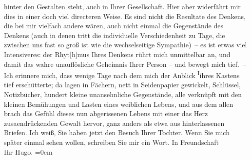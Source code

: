 \begin{ledgroupsized}[t]{13cm}
               hinter den Gestalten steht, auch in Ihrer Gesellschaft. Hier aber widerfährt mir dies
               in einer doch viel directeren Weise. Es sind nicht die Resultate des Denkens, die bei
               mir vielfach andere wären, auch nicht einmal die Gegenstände des Denkens (auch in
               denen tritt die individuelle Verschiedenheit zu Tage, die zwischen uns fast so groß
               ist wie die wechselseitige Sympathie) – {\pb}es ist etwas viel Intensiveres:
               der Rhyt{[}h{]}mus Ihres Denkens rührt mich unmittelbar an, und damit
               das wahre unauflösliche Geheimnis Ihrer Person – und bewegt mich tief. – Ich erinnere
               mich, dass wenige Tage nach dem \label{K_L02496-1v}\label{K_L02496-1h} mich der Anblick \substVorne{}\textsuperscript{I}\substDazwischen{}i\substHinten{}hres Kastens tief erschütterte; da lagen in Fächern, nett in Seidenpapier
               gewickelt, Schlüssel, Notizbücher, hundert kleine unansehnliche Gegenstände, alle
               verknüpft mit den kleinen Bemühungen und Lasten eines weiblichen Lebens, und aus dem
               allen brach das Gefühl dieses nun abgerissenen Lebens mit einer das Herz zusa{\geminationm}endrückenden Gewalt hervor, ganz anders als etwa aus
               hinterlassenen Briefen.\pend
           \pstart
           Ich weiß, Sie haben jetzt den Besuch Ihrer Tochter. Wenn Sie mich später einmal sehen wollen,
               schreiben Sie mir ein Wort.\pend
           \pstart
           In Freundschaft{\\[\baselineskip]}Ihr \spacefill\mbox{Hugo.}\pend
           \leftskip=0em{}
         
         \endnumbering{}\end{ledgroupsized}  \newcommand{\dateiname}{L02496}\newcommand{\titel}{Hugo Hofmannsthal an Arthur Schnitzler, 29. 12. 1927}\newcommand{\editorInnen}{Martin Anton Müller und Gerd-Hermann Susen}
      